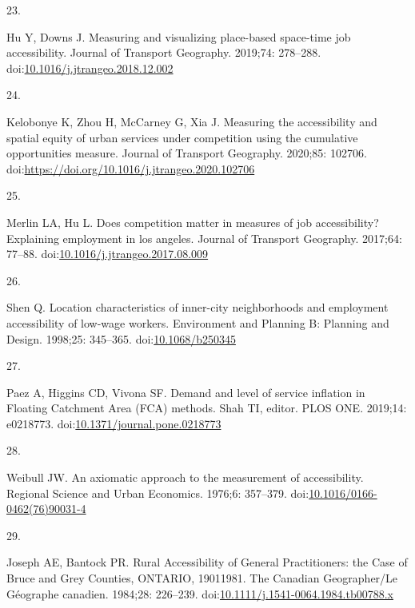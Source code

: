 \documentclass[10pt,letterpaper]{article}
\newlength{\cslhangindent}
\newlength{\csllabelwidth}
\newlength{\cslentryspacingunit} %
\newenvironment{CSLReferences}[2] %
 {%
  \setlength{\parindent}{0pt}
  \ifodd #1
  \let\oldpar\par
  \def\par{\hangindent=\cslhangindent\oldpar}
  \fi
  \setlength{\parskip}{#2\cslentryspacingunit}
 }%
 {}
\newcommand{\CSLLeftMargin}[1]{\parbox[t]{\csllabelwidth}{#1}}
\newcommand{\CSLRightInline}[1]{\parbox[t]{\linewidth - \csllabelwidth}{#1}\break}
\begin{document}
\begin{CSLReferences}{0}{0}
\leavevmode{}%
\CSLLeftMargin{23. }%
\CSLRightInline{Hu Y, Downs J. Measuring and visualizing place-based
space-time job accessibility. Journal of Transport Geography. 2019;74:
278--288.
doi:\href{https://doi.org/10.1016/j.jtrangeo.2018.12.002}{10.1016/j.jtrangeo.2018.12.002}}

\leavevmode{}%
\CSLLeftMargin{24. }%
\CSLRightInline{Kelobonye K, Zhou H, McCarney G, Xia J. Measuring the
accessibility and spatial equity of urban services under competition
using the cumulative opportunities measure. Journal of Transport
Geography. 2020;85: 102706.
doi:\url{https://doi.org/10.1016/j.jtrangeo.2020.102706}}

\leavevmode{}%
\CSLLeftMargin{25. }%
\CSLRightInline{Merlin LA, Hu L. Does competition matter in measures of
job accessibility? Explaining employment in los angeles. Journal of
Transport Geography. 2017;64: 77--88.
doi:\href{https://doi.org/10.1016/j.jtrangeo.2017.08.009}{10.1016/j.jtrangeo.2017.08.009}}

\leavevmode{}%
\CSLLeftMargin{26. }%
\CSLRightInline{Shen Q. Location characteristics of inner-city
neighborhoods and employment accessibility of low-wage workers.
Environment and Planning B: Planning and Design. 1998;25: 345--365.
doi:\href{https://doi.org/10.1068/b250345}{10.1068/b250345}}

\leavevmode{}%
\CSLLeftMargin{27. }%
\CSLRightInline{Paez A, Higgins CD, Vivona SF. Demand and level of
service inflation in Floating Catchment Area (FCA) methods. Shah TI,
editor. PLOS ONE. 2019;14: e0218773.
doi:\href{https://doi.org/10.1371/journal.pone.0218773}{10.1371/journal.pone.0218773}}

\leavevmode{}%
\CSLLeftMargin{28. }%
\CSLRightInline{Weibull JW. An axiomatic approach to the measurement of
accessibility. Regional Science and Urban Economics. 1976;6: 357--379.
doi:\href{https://doi.org/10.1016/0166-0462(76)90031-4}{10.1016/0166-0462(76)90031-4}}

\leavevmode{}%
\CSLLeftMargin{29. }%
\CSLRightInline{Joseph AE, Bantock PR. Rural Accessibility of General
Practitioners: the Case of Bruce and Grey Counties, ONTARIO,
1901{\textendash}1981. The Canadian Geographer/Le Géographe canadien.
1984;28: 226--239.
doi:\href{https://doi.org/10.1111/j.1541-0064.1984.tb00788.x}{10.1111/j.1541-0064.1984.tb00788.x}}


\end{CSLReferences}
\end{document}
